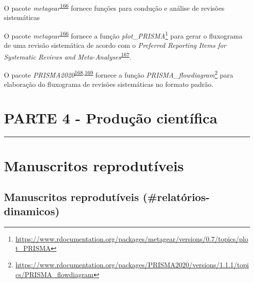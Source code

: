 \documentclass[
  a4paper,
]{book}
\renewcommand{\href}[2]{#2\footnote{\url{#1}}}
\newenvironment{infobox}[1]
  {
  \begin{itemize}
  \renewcommand{\labelitemi}{
    \raisebox{-.7\height}[0pt][0pt]{
      {\setkeys{Gin}{width=3em,keepaspectratio}
        \texttt{[image: \#1]}}
    }
  }
  \setlength{\fboxsep}{1em}
  \begin{blackbox}
  \item
  }
  {
  \end{blackbox}
  \end{itemize}
  }
\begin{document}
\begin{infobox}{images/Rlogo}
O pacote \emph{metagear}\textsuperscript{\protect\hyperlink{ref-metagear}{166}} fornece funções para condução e análise de revisões sistemáticas

\end{infobox}

\begin{infobox}{images/Rlogo}
O pacote \emph{metagear}\textsuperscript{\protect\hyperlink{ref-metagear}{166}} fornece a função \href{https://www.rdocumentation.org/packages/metagear/versions/0.7/topics/plot_PRISMA}{\emph{plot\_PRISMA}} para gerar o fluxograma de uma revisão sistemática de acordo com o \emph{Preferred Reporting Items for Systematic Reviews and Meta-Analyses}\textsuperscript{\protect\hyperlink{ref-Moher2015}{167}}.

\end{infobox}

\begin{infobox}{images/Rlogo}
O pacote \emph{PRISMA2020}\textsuperscript{\protect\hyperlink{ref-PRISMA2020-2}{168},\protect\hyperlink{ref-PRISMA2020}{169}} fornece a função \href{https://www.rdocumentation.org/packages/PRISMA2020/versions/1.1.1/topics/PRISMA_flowdiagram}{\emph{PRISMA\_flowdiagram}} para elaboração do fluxograma de revisões sistemáticas no formato padrão.

\end{infobox}


\hypertarget{parte-4---produuxe7uxe3o-cientuxedfica}{%
\chapter*{\texorpdfstring{\textbf{PARTE 4 - Produção científica}}{PARTE 4 - Produção científica}}\label{parte-4---produuxe7uxe3o-cientuxedfica}}

\markboth{}{}
\par\noindent\rule{\textwidth}{0.05in}

\hypertarget{manuscritos-reprodutiveis}{%
\chapter{\texorpdfstring{\textbf{Manuscritos reprodutíveis}}{Manuscritos reprodutíveis}}\label{manuscritos-reprodutiveis}}

\hypertarget{manuscritos-reprodutuxedveis-relatuxf3rios-dinamicos}{%
\section{Manuscritos reprodutíveis (\#relatórios-dinamicos)}\label{manuscritos-reprodutuxedveis-relatuxf3rios-dinamicos}}
\end{document}
